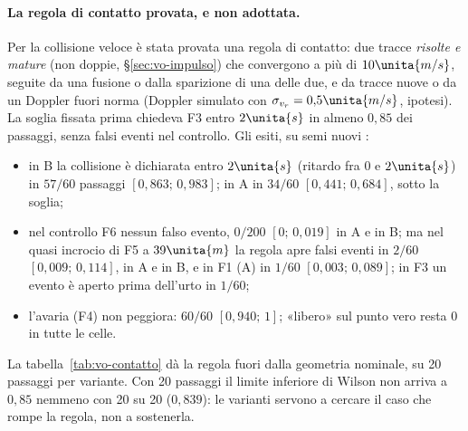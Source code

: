 \paragraph{La regola di contatto provata, e non adottata.} Per la collisione veloce è stata provata una regola di contatto: due tracce \emph{risolte e mature} (non doppie, \S\ref{sec:vo-impulso}) che convergono a più di $10\unita{m/s}$, seguite da una fusione o dalla sparizione di una delle due, e da tracce nuove o da un Doppler fuori norma (Doppler simulato con $\sigma_{v_r}=0{,}5\unita{m/s}$, ipotesi). La soglia fissata prima chiedeva F3 entro $2\unita{s}$ in almeno $0{,}85$ dei passaggi, senza falsi eventi nel controllo. Gli esiti, su semi nuovi :
\begin{itemize}
\item in B la collisione è dichiarata entro $2\unita{s}$ (ritardo fra $0$ e $2\unita{s}$) in $57/60$ passaggi $[0{,}863;\,0{,}983]$; in A in $34/60$ $[0{,}441;\,0{,}684]$, sotto la soglia;
\item nel controllo F6 nessun falso evento, $0/200$ $[0;\,0{,}019]$ in A e in B; ma nel quasi incrocio di F5 a $39\unita{m}$ la regola apre falsi eventi in $2/60$ $[0{,}009;\,0{,}114]$, in A e in B, e in F1 (A) in $1/60$ $[0{,}003;\,0{,}089]$; in F3 un evento è aperto prima dell'urto in $1/60$;
\item l'avaria (F4) non peggiora: $60/60$ $[0{,}940;\,1]$; «libero» sul punto vero resta 0 in tutte le celle.
\end{itemize}
La tabella~\ref{tab:vo-contatto} dà la regola fuori dalla geometria nominale, su 20 passaggi per variante. Con 20 passaggi il limite inferiore di Wilson non arriva a $0{,}85$ nemmeno con 20 su 20 ($0{,}839$): le varianti servono a cercare il caso che rompe la regola, non a sostenerla.

